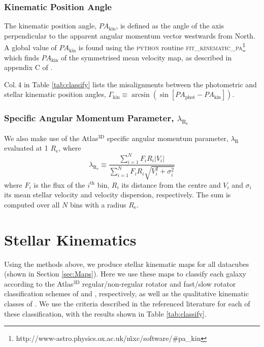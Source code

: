 \documentclass[a4paper,fleqn,usenatbib]{mnras}
\begin{document}
		\subsubsection{Kinematic Position Angle}
			\label{subsubsec:KinPA}
			The kinematic position angle, $PA_\text{kin}$, is defined as the angle of the axis perpendicular to the apparent angular momentum vector westwards from North. A global value of $PA_\text{kin}$ is found using the \textsc{python} routine \textsc{fit\_kinematic\_pa}\footnote{http://www-astro.physics.ox.ac.uk/\~mxc/software/\#pa\_kin} which finds $PA_\text{kin}$ of the symmetrised mean velocity map, as described in appendix C of \citet{Krajnovic2006}. %

			Col.\,4 in Table \ref{tab:classify} lists the misalignments between the photometric and stellar kinematic position angles, $\Gamma_\text{kin} \equiv \arcsin(\sin[PA_\text{phot} - PA_\text{kin}])$.

		\subsubsection{Specific Angular Momentum Parameter, $\lambda_\mathrm{R_e}$}
			We also make use of the Atlas$^\text{3D}$ specific angular momentum parameter, $\lambda_\text{R}$ \citep{Emsellem2007} evaluated at 1 $R_\text{e}$, where 
			\begin{equation}
				\lambda_\mathrm{R_e} \equiv \frac{\sum_{i=1}^{N} F_i R_i |V_i|}{\sum_{i=1}^{N} F_i R_i \sqrt{V_i^2 + \sigma_i^2}}
			\end{equation}
			where $F_i$ is the flux of the $i^\text{th}$ bin, $R_i$ its distance from the centre and $V_i$ and $\sigma_i$ its mean stellar velocity and velocity dispersion, respectively. The sum is computed over all $N$ bins with a radius $R_\text{e}$.

\section{Stellar Kinematics}
	\label{sec:StarKine}
	Using the methods above, we produce stellar kinematic maps for all datacubes (shown in Section \ref{sec:Maps}). Here we use these maps to classify each galaxy according to the Atlas$^\text{3D}$ regular/non-regular rotator and fast/slow rotator classification schemes of \citet{Krajnovic2006} and \citet{Cappellari2016}, respectively, as well as the qualitative kinematic classes of \citet{Krajnovic2011}. We use the criteria described in the referenced literature for each of these classification, with the results shown in Table \ref{tab:classify}.
\end{document}
